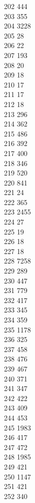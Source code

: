 { 202	444 \\
 203	355 \\
 204	3228 \\
 205	28 \\
 206	22 \\
 207	193 \\
 208	20 \\
 209	18 \\
 210	17 \\
 211	17 \\
 212	18 \\
 213	296 \\
 214	362 \\
 215	486 \\
 216	392 \\
 217	400 \\
 218	346 \\
 219	520 \\
 220	841 \\
 221	24 \\
 222	365 \\
 223	2455 \\
 224	27 \\
 225	19 \\
 226	18 \\
 227	18 \\
 228	7258 \\
 229	289 \\
 230	447 \\
 231	779 \\
 232	417 \\
 233	345 \\
 234	359 \\
 235	1178 \\
 236	325 \\
 237	458 \\
 238	476 \\
 239	467 \\
 240	371 \\
 241	347 \\
 242	422 \\
 243	409 \\
 244	453 \\
 245	1983 \\
 246	417 \\
 247	472 \\
 248	1985 \\
 249	421 \\
 250	1147 \\
 251	421 \\
 252	340 \\
}
